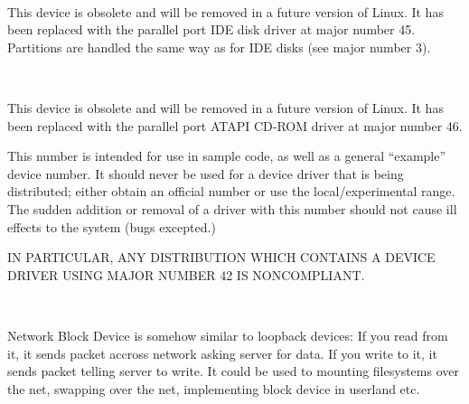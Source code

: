 \begin{devicelist}
\\
\end{devicelist}

\noindent
This device is obsolete and will be removed in a future version of
Linux.  It has been replaced with the parallel port IDE disk driver at
major number 45.  Partitions are handled the same way as for IDE disks
(see major number 3).

\begin{devicelist}
\\
\end{devicelist}

\noindent
This device is obsolete and will be removed in a future version of
Linux.  It has been replaced with the parallel port ATAPI CD-ROM
driver at major number 46.

\begin{devicelist}
\end{devicelist}

\noindent
This number is intended for use in sample code, as well as a general
``example'' device number.  It should never be used for a device
driver that is being distributed; either obtain an official number or
use the local/experimental range.  The sudden addition or removal of a
driver with this number should not cause ill effects to the system
(bugs excepted.)

IN PARTICULAR, ANY DISTRIBUTION WHICH CONTAINS A DEVICE DRIVER USING
MAJOR NUMBER 42 IS NONCOMPLIANT.

\begin{devicelist}
	\minordots
\\
	\minordots
\end{devicelist}

\noindent
Network Block Device is somehow similar to loopback devices: If you
read from it, it sends packet accross network asking server for
data. If you write to it, it sends packet telling server to write. It
could be used to mounting filesystems over the net, swapping over the
net, implementing block device in userland etc.


